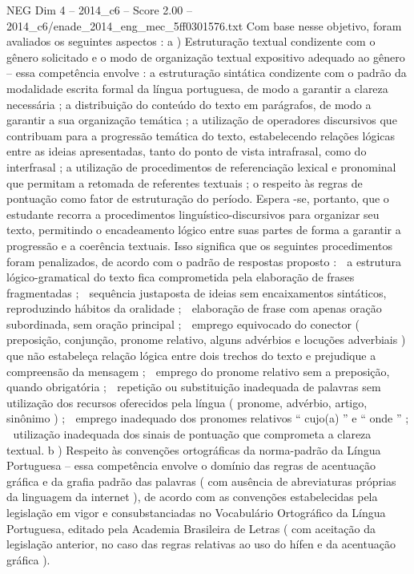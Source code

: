 \begin{textsample}{NEG Dim 4 – 2014\_c6 – Score 2.00 – 2014\_c6/enade\_2014\_eng\_mec\_5ff0301576.txt}
Com base nesse objetivo, foram avaliados os seguintes aspectos : a ) Estruturação textual condizente com o gênero solicitado e o modo de organização textual expositivo adequado ao gênero – essa competência envolve : a estruturação sintática condizente com o padrão da modalidade escrita formal da língua portuguesa, de modo a garantir a clareza necessária ; a distribuição do conteúdo do texto em parágrafos, de modo a garantir a sua organização temática ; a utilização de operadores discursivos que contribuam para a progressão temática do texto, estabelecendo relações lógicas entre as ideias apresentadas, tanto do ponto de vista intrafrasal, como do interfrasal ; a utilização de procedimentos de referenciação lexical e pronominal que permitam a retomada de referentes textuais ; o respeito às regras de pontuação como fator de estruturação do período.
Espera -se, portanto, que o estudante recorra a procedimentos linguístico-discursivos para organizar seu texto, permitindo o encadeamento lógico entre suas partes de forma a garantir a progressão e a coerência textuais.
Isso significa que os seguintes procedimentos foram penalizados, de acordo com o padrão de respostas proposto :  a estrutura lógico-gramatical do texto fica comprometida pela elaboração de frases fragmentadas ;  sequência justaposta de ideias sem encaixamentos sintáticos, reproduzindo hábitos da oralidade ;  elaboração de frase com apenas oração subordinada, sem oração principal ;  emprego equivocado do conector ( preposição, conjunção, pronome relativo, alguns advérbios e locuções adverbiais ) que não estabeleça relação lógica entre dois trechos do texto e prejudique a compreensão da mensagem ;  emprego do pronome relativo sem a preposição, quando obrigatória ;  repetição ou substituição inadequada de palavras sem utilização dos recursos oferecidos pela língua ( pronome, advérbio, artigo, sinônimo ) ;  emprego inadequado dos pronomes relativos “ cujo(a) ” e “ onde ” ;  utilização inadequada dos sinais de pontuação que comprometa a clareza textual. b ) Respeito às convenções ortográficas da norma-padrão da Língua Portuguesa – essa competência envolve o domínio das regras de acentuação gráfica e da grafia padrão das palavras ( com ausência de abreviaturas próprias da linguagem da internet ), de acordo com as convenções estabelecidas pela legislação em vigor e consubstanciadas no Vocabulário Ortográfico da Língua Portuguesa, editado pela Academia Brasileira de Letras ( com aceitação da legislação anterior, no caso das regras relativas ao uso do hífen e da acentuação gráfica ).

\end{textsample}
